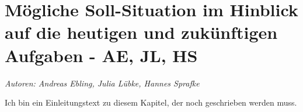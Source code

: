 \chapter{Mögliche Soll-Situation im Hinblick auf die heutigen und zukünftigen Aufgaben - AE, JL, HS}
\label{chapter_sollsituation_INM}
\textit{Autoren: Andreas Ebling, Julia Lübke, Hannes Sprafke}

Ich bin ein Einleitungstext zu diesem Kapitel, der noch geschrieben werden muss.





